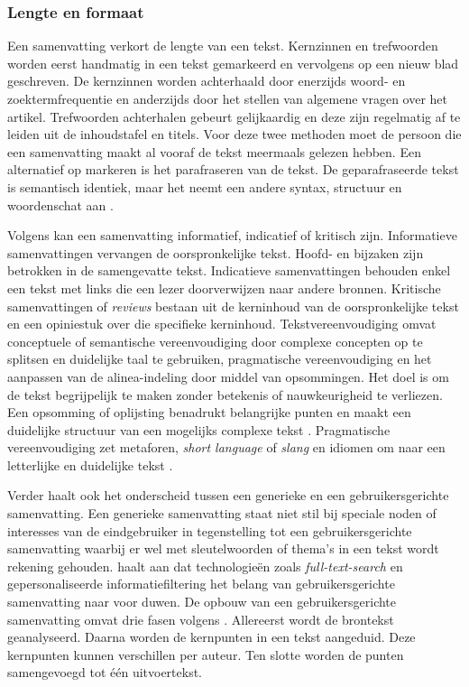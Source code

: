 \subsubsection{Lengte en formaat}

Een samenvatting verkort de lengte van een tekst. Kernzinnen en trefwoorden worden eerst handmatig in een tekst gemarkeerd en vervolgens op een nieuw blad geschreven. De kernzinnen worden achterhaald door enerzijds woord- en zoektermfrequentie en anderzijds door het stellen van algemene vragen over het artikel. Trefwoorden achterhalen gebeurt gelijkaardig en deze zijn regelmatig af te leiden uit de inhoudstafel en titels. Voor deze twee methoden moet de persoon die een samenvatting maakt al vooraf de tekst meermaals gelezen hebben. Een alternatief op markeren is het parafraseren van de tekst. De geparafraseerde tekst is semantisch identiek, maar het neemt een andere syntax, structuur en woordenschat aan \autocite{Rijkhoff2022}.

Volgens \textcite{Hahn2000} kan een samenvatting informatief, indicatief of kritisch zijn. Informatieve samenvattingen vervangen de oorspronkelijke tekst. Hoofd- en bijzaken zijn betrokken in de samengevatte tekst. Indicatieve samenvattingen behouden enkel een tekst met links die een lezer doorverwijzen naar andere bronnen. Kritische samenvattingen of \textit{reviews} bestaan uit de kerninhoud van de oorspronkelijke tekst en een opiniestuk over die specifieke kerninhoud. Tekstvereenvoudiging omvat conceptuele of semantische vereenvoudiging door complexe concepten op te splitsen en duidelijke taal te gebruiken, pragmatische vereenvoudiging en het aanpassen van de alinea-indeling door middel van opsommingen. Het doel is om de tekst begrijpelijk te maken zonder betekenis of nauwkeurigheid te verliezen. Een opsomming of oplijsting benadrukt belangrijke punten en maakt een duidelijke structuur van een mogelijks complexe tekst \autocite{Siddharthan2014, Hale2022}. Pragmatische vereenvoudiging zet metaforen, \textit{short language} of \textit{slang} en idiomen om naar een letterlijke en duidelijke tekst \autocite{JavoureyDrevet2022}.

Verder haalt \textcite{Hahn2000} ook het onderscheid tussen een generieke en een gebruikersgerichte samenvatting. Een generieke samenvatting staat niet stil bij speciale noden of interesses van de eindgebruiker in tegenstelling tot een gebruikersgerichte samenvatting waarbij er wel met sleutelwoorden of thema's in een tekst wordt rekening gehouden. \textcite{Hahn2000} haalt aan dat technologieën zoals \textit{full-text-search} en gepersonaliseerde informatiefiltering het belang van gebruikersgerichte samenvatting naar voor duwen. De opbouw van een gebruikersgerichte samenvatting omvat drie fasen volgens \textcite{Hahn2000}. Allereerst wordt de brontekst geanalyseerd. Daarna worden de kernpunten in een tekst aangeduid. Deze kernpunten kunnen verschillen per auteur. Ten slotte worden de punten samengevoegd tot één uitvoertekst.

